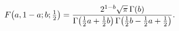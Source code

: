 \[\mathop{F\/}\nolimits\!\left(a,1-a;b;\tfrac{1}{2}\right)=\frac{2^{1-b}\sqrt{%
\pi}\mathop{\Gamma\/}\nolimits\!\left(b\right)}{\mathop{\Gamma\/}\nolimits\!%
\left(\tfrac{1}{2}a+\tfrac{1}{2}b\right)\mathop{\Gamma\/}\nolimits\!\left(%
\tfrac{1}{2}b-\tfrac{1}{2}a+\tfrac{1}{2}\right)}.\]